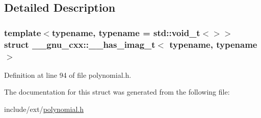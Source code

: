 \subsection{Detailed Description}
\subsubsection*{template$<$typename, typename = std\+::void\+\_\+t$<$$>$$>$\newline
struct \+\_\+\+\_\+gnu\+\_\+cxx\+::\+\_\+\+\_\+has\+\_\+imag\+\_\+t$<$ typename, typename $>$}



Definition at line 94 of file polynomial.\+h.



The documentation for this struct was generated from the following file\+:\begin{DoxyCompactItemize}
\item 
include/ext/\hyperlink{polynomial_8h}{polynomial.\+h}\end{DoxyCompactItemize}
